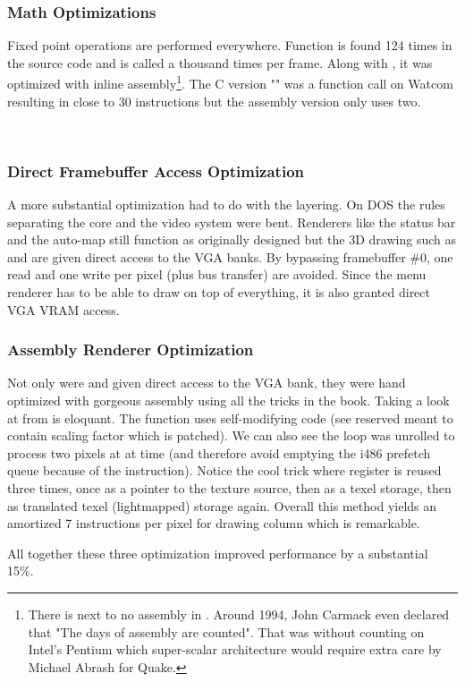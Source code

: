 \subsubsection{Math Optimizations}
Fixed point operations are performed everywhere. Function  is found 124 times in the source code and is called a thousand times per frame. Along with , it was optimized with inline assembly\footnote{There is next to no assembly in \doom. Around 1994, John Carmack even declared that "The days of assembly are counted". That was without counting on Intel's Pentium which super-scalar architecture would require extra care by Michael Abrash for Quake.}. The C version "" was a function call on Watcom resulting in close to 30 instructions but the assembly version only uses two.\\
\par
{}\\


\vspace{-2mm}
\subsubsection{Direct Framebuffer Access Optimization}
A more substantial optimization had to do with the layering. On DOS the rules separating the core and the video system were bent. Renderers like the status bar and the auto-map still function as originally designed but the 3D drawing such as  and  are given direct access to the VGA banks. By bypassing framebuffer \#0, one read and one write per pixel (plus bus transfer) are avoided. Since the menu renderer has to be able to draw on top of everything, it is also granted direct VGA VRAM access.\\



\subsubsection{Assembly Renderer Optimization}
Not only were  and  given direct access to the VGA bank, they were hand optimized with gorgeous assembly using all the tricks in the book. Taking a look at  from  is eloquant. The function uses self-modifying code (see reserved  meant to contain scaling factor which is patched). We can also see the loop was unrolled to process two pixels at at time (and therefore avoid emptying the i486 prefetch queue because of the  instruction). Notice the cool trick where register  is reused three times, once as a pointer to the texture source, then as a  texel storage, then as  translated texel (lightmapped) storage again. Overall this method yields an amortized 7 instructions per pixel for drawing column which is remarkable.\\
\par
All together these three optimization improved performance by a substantial 15\%.






